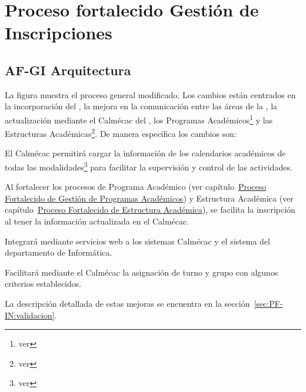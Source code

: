 \chapter{Proceso fortalecido Gestión de Inscripciones}
\hypertarget{chapter:PFGI}{}
\section{AF-GI Arquitectura}

	La figura  muestra el proceso general modificado. Los cambios están centrados en la incorporación del , la mejora en la comunicación entre las áreas de la , la actualización mediante el Calmécac del , los Programas Académicos\footnote{ver } y las Estructuras Académicas\footnote{ver }. De manera específica los cambios son:
\begin{Citemize}
	\item El Calmécac permitirá cargar la información de los calendarios académicos de todas las modalidades\footnote{ver } para facilitar la supervisión y control de las actividades.
	\item Al fortalecer los procesos de Programa Académico (ver capítulo~\hyperlink{chapter:PFGPA}{Proceso Fortalecido de Gestión de Programas Académicos}) y Estructura Académica (ver capítulo~\hyperlink{chapter:PFEA}{Proceso Fortalecido de Estructura Académica}), se facilita la inscripción al tener la información actualizada en el Calmécac.
	\item Integrará mediante servicios web a los sistemas Calmécac y el sistema del departamento de Informática.
	\item Facilitará mediante el Calmécac la asignación de turno y grupo con algunos criterios establecidos.
\end{Citemize}

	La descripción detallada de estas mejoras se encuentra en la sección~\ref{sec:PF-IN:validacion}.



